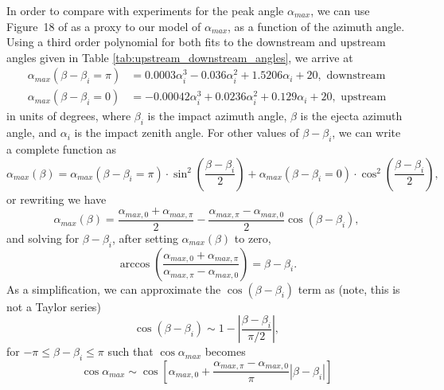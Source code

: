 \documentclass{hitec}
\numberwithin{equation}{section}
\begin{document}
In order to compare with experiments for the peak angle $\alpha_{max}$, we can use Figure~18 of \cite{gault1978experimental} as a proxy to our model of $\alpha_{max}$, as a function of the azimuth angle. Using a third order polynomial for both fits to the downstream and upstream angles given in Table \ref{tab:upstream_downstream_angles}, we arrive at
\begin{align}
\alpha_{max}(\beta - \beta_i = \pi) &= 0.0003\alpha_i^3 - 0.036\alpha_i^2 + 1.5206\alpha_i + 20, \text{ downstream}\\
\alpha_{max}(\beta - \beta_i = 0) &= -0.00042\alpha_i^3 + 0.0236\alpha_i^2 + 0.129\alpha_i + 20, \text{ upstream}
\end{align}
in units of degrees, where $\beta_i$ is the impact azimuth angle, $\beta$ is the ejecta azimuth angle, and $\alpha_i$ is the impact zenith angle. For other values of $\beta - \beta_i$, we can write a complete function as
\begin{equation}
\alpha_{max}(\beta) = \alpha_{max}(\beta - \beta_i = \pi)\cdot \sin^2\left(\frac{\beta - \beta_i}{2}\right)
+ \alpha_{max}(\beta - \beta_i = 0)\cdot \cos^2\left(\frac{\beta - \beta_i}{2}\right),
\end{equation}
or rewriting we have
\begin{equation}
\alpha_{max}(\beta) = \frac{\alpha_{max,0}+\alpha_{max,\pi}}{2} - \frac{\alpha_{max,\pi}-\alpha_{max,0}}{2}\cos(\beta-\beta_i),
\end{equation}
and solving for $\beta-\beta_i$, after setting $\alpha_{max}(\beta)$ to zero,
\begin{equation}
\arccos\left(\frac{\alpha_{max,0}+\alpha_{max,\pi}}{\alpha_{max,\pi}-\alpha_{max,0}}\right) = \beta-\beta_i.
\end{equation}
As a simplification, we can approximate the $\cos(\beta-\beta_i)$ term as (note, this is not a Taylor series)
\begin{equation}
\cos(\beta-\beta_i) \sim 1 - \left|\frac{\beta-\beta_i}{\pi/2}\right|,
\end{equation}
for $-\pi \le \beta-\beta_i \le \pi$ such that $\cos\alpha_{max}$ becomes
\begin{equation}\label{eq:cos_a_max_approx}
\cos\alpha_{max} \sim \cos\left[\alpha_{max,0}+\frac{\alpha_{max,\pi}-\alpha_{max,0}}{\pi}|\beta-\beta_i|\right]
\end{equation}
\end{document}
